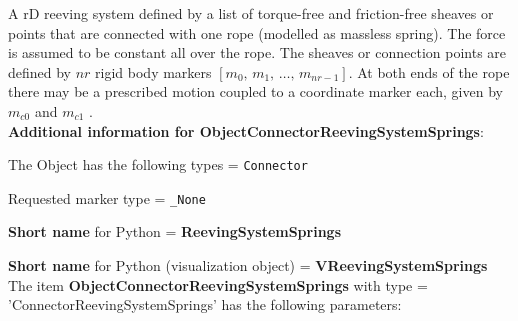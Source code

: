 \label{sec:item:ObjectConnectorReevingSystemSprings}
A rD reeving system defined by a list of torque-free and friction-free sheaves or points that are connected with one rope (modelled as massless spring). The force is assumed to be constant all over the rope. The sheaves or connection points are defined by $nr$ rigid body markers $[m_0, \, m_1, \, \ldots, \, m_{nr-1}]$. At both ends of the rope there may be a prescribed motion coupled to a coordinate marker each, given by $m_{c0}$ and $m_{c1}$ .\vspace{12pt}
 \\{\bf Additional information for ObjectConnectorReevingSystemSprings}:
\bi
  \item The Object has the following types = \texttt{Connector}
  \item Requested marker type = \texttt{\_None}
  \item {\bf Short name} for Python = {\bf ReevingSystemSprings}  \item {\bf Short name} for Python (visualization object) = {\bf VReevingSystemSprings}\ei
\vspace{12pt} \noindent The item {\bf ObjectConnectorReevingSystemSprings} with type = 'ConnectorReevingSystemSprings' has the following parameters:\vspace{-1cm}\\ 
